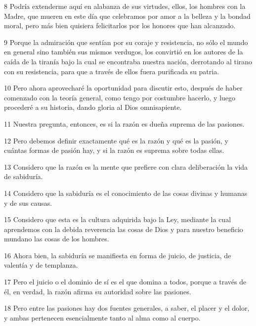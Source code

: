 \par 8 Podría extenderme aquí en alabanza de sus virtudes, ellos, los hombres con la Madre, que mueren en este día que celebramos por amor a la belleza y la bondad moral, pero más bien quisiera felicitarlos por los honores que han alcanzado.

\par 9 Porque la admiración que sentían por su coraje y resistencia, no sólo el mundo en general sino también sus mismos verdugos, los convirtió en los autores de la caída de la tiranía bajo la cual se encontraba nuestra nación, derrotando al tirano con su resistencia, para que a través de ellos fuera purificada su patria.

\par 10 Pero ahora aprovecharé la oportunidad para discutir esto, después de haber comenzado con la teoría general, como tengo por costumbre hacerlo, y luego procederé a su historia, dando gloria al Dios omnisapiente.

\par 11 Nuestra pregunta, entonces, es si la razón es dueña suprema de las pasiones.

\par 12 Pero debemos definir exactamente qué es la razón y qué es la pasión, y cuántas formas de pasión hay, y si la razón es suprema sobre todas ellas.

\par 13 Considero que la razón es la mente que prefiere con clara deliberación la vida de sabiduría.

\par 14 Considero que la sabiduría es el conocimiento de las cosas divinas y humanas y de sus causas.

\par 15 Considero que esta es la cultura adquirida bajo la Ley, mediante la cual aprendemos con la debida reverencia las cosas de Dios y para nuestro beneficio mundano las cosas de los hombres.

\par 16 Ahora bien, la sabiduría se manifiesta en forma de juicio, de justicia, de valentía y de templanza.

\par 17 Pero el juicio o el dominio de sí es el que domina a todos, porque a través de él, en verdad, la razón afirma su autoridad sobre las pasiones.

\par 18 Pero entre las pasiones hay dos fuentes generales, a saber, el placer y el dolor, y ambas pertenecen esencialmente tanto al alma como al cuerpo.

